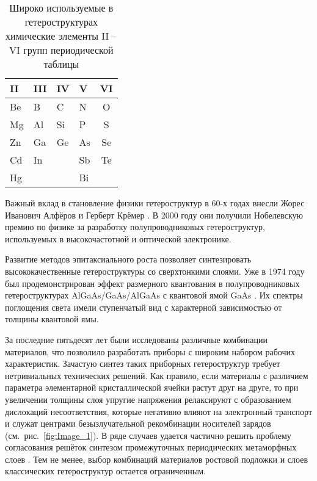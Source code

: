 \begin{table} [htbp]
	\centering
	\begin{threeparttable}%
		\caption{Широко используемые в гетероструктурах химические элементы II\,--\,VI групп периодической таблицы}\label{tab:tab1}%
		\begin{tabular}{ p{3cm}  p{3cm}  p{3cm}  p{3cm}  c }
			\hline
			\hline
			II & III & IV  & V & VI \\
			\hline
			Be & B  & C  & N   & O   \\
			Mg & Al & Si & P   & S   \\
			Zn & Ga & Ge & As  & Se  \\
			Cd & In &    & Sb  & Te  \\
			Hg &    &    & Bi  &   \\
			\hline
			\hline
		\end{tabular}
	\end{threeparttable}
\end{table}

Важный вклад в становление физики гетероструктур в 60-х годах внесли Жорес Иванович Алфёров \cite{Alferov2001} и Герберт Крёмер \cite{Kroemer1957}. В 2000 году они получили Нобелевскую премию по физике за разработку полупроводниковых гетероструктур, используемых в высокочастотной и оптической электронике.

Развитие методов эпитаксиального роста позволяет синтезировать высококачественные гетероструктуры со сверхтонкими слоями. Уже в 1974 году был продемонстрирован эффект размерного квантования в полупроводниковых гетероструктурах AlGaAs/GaAs/AlGaAs с квантовой ямой GaAs \cite{Dingle1974}. Их спектры поглощения света имели ступенчатый вид с характерной зависимостью от толщины квантовой ямы.

За последние пятьдесят лет были исследованы различные комбинации материалов, что позволило разработать приборы с широким набором рабочих характеристик. Зачастую синтез таких приборных гетероструктур требует нетривиальных технических решений. Как правило, если материалы с различием параметра элементарной кристаллической ячейки растут друг на друге, то при увеличении толщины слоя упругие напряжения релаксируют с образованием дислокаций несоответствия, которые негативно влияют на электронный транспорт и служат центрами безызлучательной рекомбинации носителей зарядов (см.~рис.~\cref{fig:Image_1}). В ряде случаев удается частично решить проблему согласования решёток синтезом промежуточных периодических метаморфных слоев \cite{Bolshakov2019}. Тем не менее, выбор комбинаций материалов ростовой подложки и слоев классических гетероструктур остается ограниченным.

